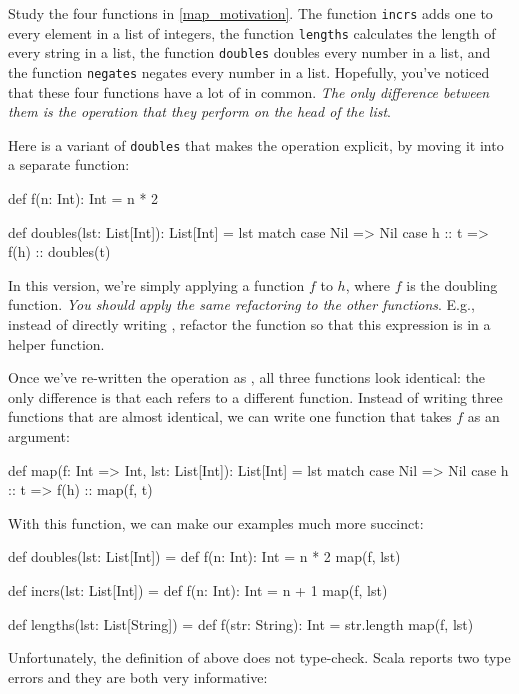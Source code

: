 \documentclass{book}
\begin{document}
Study the four functions in \cref{map_motivation}. The function \verb|incrs|
adds one to every element in a list of integers, the function \verb|lengths|
calculates the length of every string in a list, the function \verb|doubles|
doubles every number in a list, and the function \verb|negates| negates every
number in a list. Hopefully, you've noticed that these four functions have a lot
of in common. \emph{The only difference between them is the operation that they
perform on the head of the list}.

Here is a variant of \verb|doubles| that makes the operation explicit, by
moving it into a separate function:
%
\begin{scalacode}
def f(n: Int): Int = n * 2

def doubles(lst: List[Int]): List[Int] = lst match {
  case Nil => Nil
  case h :: t => f(h) :: doubles(t)
}
\end{scalacode}

In this version, we're simply applying a function $f$ to $h$, where $f$
is the doubling function. \emph{You should apply the same refactoring to the other
functions}. E.g.,  instead of directly writing , refactor
the function so that this expression is in a helper function.

Once we've re-written the operation as , all three
functions look identical: the only difference is that each refers to a
different function.
Instead of writing three functions that are almost identical, we can
write one function that takes $f$ as an argument:

\begin{scalacode}
def map(f: Int => Int, lst: List[Int]): List[Int] = lst match {
  case Nil => Nil
  case h :: t => f(h) :: map(f, t)
}
\end{scalacode}

With this function, we can make our examples much more succinct:

\begin{scalacode}
def doubles(lst: List[Int]) = {
  def f(n: Int): Int = n * 2
  map(f, lst)
}

def incrs(lst: List[Int]) = {
  def f(n: Int): Int = n + 1
  map(f, lst)
}

def lengths(lst: List[String]) = {
  def f(str: String): Int = str.length
  map(f, lst)
}
\end{scalacode}

Unfortunately, the definition of  above does not
type-check. Scala reports two type errors and they are both very informative:
\end{document}
